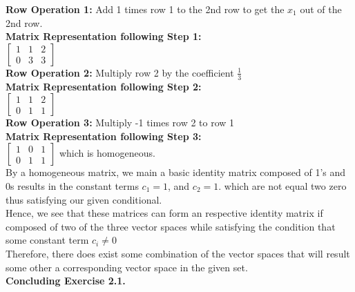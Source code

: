 \documentclass[11pt]{article}
\begin{document}
\begin{text}
\newpage

{\bf Row Operation 1:} Add 1 times row 1 to the 2nd row to get the $x_1$ out of the 2nd row.  \\
{\bf Matrix Representation following Step 1: }\\

$\begin{bmatrix} 1 & 1 & 2\\ 0 & 3 & 3 \end{bmatrix}$ \\

{\bf Row Operation 2:} Multiply row 2 by the coefficient $\frac{1}{3}$  \\
{\bf Matrix Representation following Step 2: }\\

$\begin{bmatrix} 1 & 1 & 2\\ 0 & 1 & 1 \end{bmatrix}$
\\

{\bf Row Operation 3:} Multiply -1 times row 2 to row 1\\
{\bf Matrix Representation following Step 3: }\\

$\begin{bmatrix} 1 & 0 & 1\\ 0 & 1 & 1 \end{bmatrix}$ which is homogeneous. \\

By a homogeneous matrix, we main a basic identity matrix composed of 1's and 0s results in the constant terms $c_1 = 1$, and $c_2 = 1$. which are not equal two zero thus satisfying our given conditional. \\

Hence, we see that these matrices can form an respective identity matrix if composed of two of the three vector spaces while satisfying the condition that some constant term $c_i \neq 0$ \\

Therefore, there does exist some combination of the vector spaces that will result some other a corresponding vector space in the given set. \\

{\bf Concluding Exercise 2.1. }
\end{text}

\vfill
\end{document}

